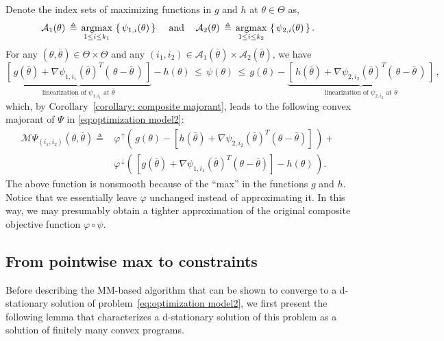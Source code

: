 \documentclass{siamart}
\newcommand{\epc}{\hspace{1pc}}
\begin{document}
Denote the index sets of
maximizing functions in $g$ and $h$ at $\theta\in \Theta$ as,
\[
\mathcal{A}_{1}(\theta) \, \triangleq  \,\displaystyle{
\operatornamewithlimits{\mbox{argmax}}_{1\leq i\leq k_1}
} \, \left\{\, \psi_{1,i}(\theta)\, \right\} \epc \mbox{and} \epc
\mathcal{A}_{2}(\theta) \, \triangleq \, \displaystyle{
\operatornamewithlimits{\mbox{argmax}}_{1\leq i\leq k_2}
} \, \left\{\, \psi_{2,i}(\theta)\, \right\}.
\]
For any $(\theta, \bar{\theta})\in \Theta \times \Theta$ and any $(i_1,i_2)\in \mathcal{A}_{1}( \bar{\theta} )\times \mathcal{A}_{2}( \bar{\theta} )$,
we have
$$
\underbrace{\left[\, g( \bar{\theta} ) + \nabla \psi_{1,i_1}( \bar{\theta} )^T \left( \, \theta - \bar{\theta} \, \right) \, \right]}_{
\mbox{linearization of $\psi_{1,i_1}$ at $\bar{\theta}$}} - h(\theta) \, \leq \, \psi(\theta) \, \leq \,
g(\theta) - \underbrace{\left[ \, h( \bar{\theta} ) + \nabla \psi_{2,i_2}( \bar{\theta} )^T \left( \, \theta - \bar{\theta} \, \right) \, \right]}_{
\mbox{linearization of $\psi_{2,i_2}$ at $\bar{\theta}$}} \,,
$$
which, by Corollary~\ref{corollary: composite majorant}, leads to the following convex majorant of $\Psi$
in \eqref{eq:optimization model2}:
\[  \begin{array}{ll}
\mathcal{M}\Psi_{(i_1,i_2)}(\theta,\bar{\theta}) \triangleq
& \varphi^{\, \uparrow}\left(\,g(\theta) - \left[ h( \bar{\theta} ) + \nabla \psi_{2,i_2}( \bar{\theta} )^T \left( \theta - \bar{\theta} \right) \right] \,\right) +
\\[0.1in]
& \varphi^{\, \downarrow}\left(\,\left[ g( \bar{\theta} ) + \nabla \psi_{1,i_1}( \bar{\theta} )^T \left( \theta - \bar{\theta} \right) \right]
- h(\theta)\, \right).
 \end{array}
\]
The above function is nonsmooth because of the ``max'' in the functions $g$ and $h$.
Notice that we essentially leave $\varphi$ unchanged instead of approximating it.  In this way, we may presumably obtain a tighter approximation
of the original composite objective function $\varphi \circ \psi$.

\subsection{From pointwise max to constraints}

Before describing the MM-based algorithm that can be shown to converge to a d-stationary solution of
problem~\eqref{eq:optimization model2}, we first present the following lemma that characterizes a d-stationary solution of this problem %
as a solution of finitely many convex programs.
\end{document}

